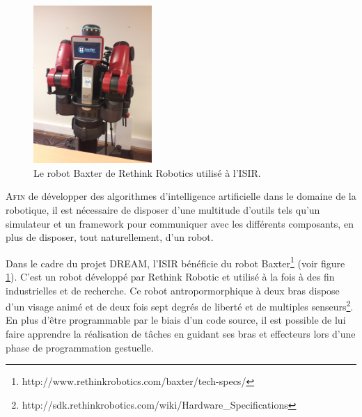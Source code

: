 \documentclass[draft]{llncs}
\begin{document}

\begin{figure}
  \begin{center}
    \includegraphics[angle=-90, width=0.4\textwidth]{figures/baxter}
  \end{center}
  \caption{Le robot Baxter de Rethink Robotics utilisé à l'ISIR.}
  \label{fig:baxter}
\end{figure}

\lettrine{A}{fin} de développer des algorithmes d'intelligence artificielle dans le domaine de la robotique, il est nécessaire de disposer d'une multitude d'outils tels qu'un simulateur et un framework pour communiquer avec les différents composants, en plus de disposer, tout naturellement, d'un robot.

Dans le cadre du projet DREAM, l'ISIR bénéficie du robot Baxter\footnote{http://www.rethinkrobotics.com/baxter/tech-specs/} (voir figure \ref{fig:baxter}).
C'est un robot développé par Rethink Robotic et utilisé à la fois à des fin industrielles et de recherche.
Ce robot antropormorphique à deux bras dispose d'un \og{}visage animé\fg{} et de deux fois sept degrés de liberté et de multiples senseurs\footnote{http://sdk.rethinkrobotics.com/wiki/Hardware\_Specifications}.
En plus d'être programmable par le biais d'un code source, il est possible de lui faire apprendre la réalisation de tâches en guidant ses bras et effecteurs lors d'une phase de programmation gestuelle.
\end{document}
